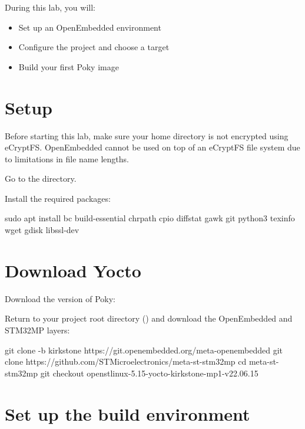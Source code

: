 
During this lab, you will:
\begin{itemize}
  \item Set up an OpenEmbedded environment
  \item Configure the project and choose a target
  \item Build your first Poky image
\end{itemize}

\section{Setup}

Before starting this lab, make sure your home directory is not
encrypted using eCryptFS. OpenEmbedded cannot be used on top of an eCryptFS file
system due to limitations in file name lengths.

Go to the  directory.

Install the required packages:
\begin{bashinput}
sudo apt install bc build-essential chrpath cpio diffstat gawk git python3 texinfo wget gdisk libssl-dev
\end{bashinput}

\section{Download Yocto}

Download the  version of Poky:

Return to your project root directory ()
and download the OpenEmbedded and STM32MP layers:
\begin{bashinput}
git clone -b kirkstone https://git.openembedded.org/meta-openembedded
git clone https://github.com/STMicroelectronics/meta-st-stm32mp
cd meta-st-stm32mp
git checkout openstlinux-5.15-yocto-kirkstone-mp1-v22.06.15
\end{bashinput}

\section{Set up the build environment}

